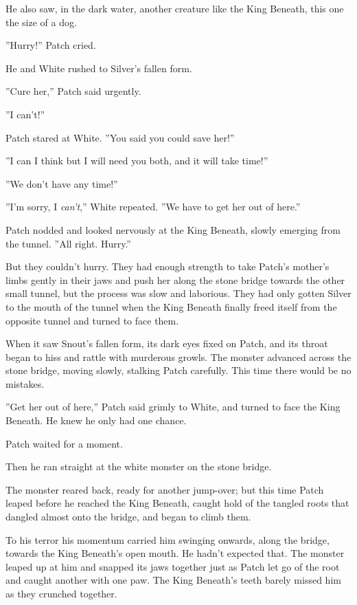 \documentclass[12pt]{book}
\begin{document}
He also saw, in the dark water, another creature like the King Beneath, this one the size of a dog.\par
''Hurry!'' Patch cried.\par
He and White rushed to Silver's fallen form.\par
''Cure her,'' Patch said urgently.\par
''I can't!''\par
Patch stared at White. ''You said you could save her!''\par
''I can %
 I think %
 but I will need you both, and it will take time!''\par
''We don't have any time!''\par
''I'm sorry, I {\it can't},'' White repeated. ''We have to get her out of here.''\par
 Patch nodded and looked nervously at the King Beneath, slowly emerging from the tunnel. ''All right. Hurry.''\par
 But they couldn't hurry. They had enough strength to take Patch's mother's limbs gently in their jaws and push her along the stone bridge towards the other small tunnel, but the process was slow and laborious. They had only gotten Silver to the mouth of the tunnel when the King Beneath finally freed itself from the opposite tunnel and turned to face them.\par
When it saw Snout's fallen form, its dark eyes fixed on Patch, and its throat began to hiss and rattle with murderous growls. The monster advanced across the stone bridge, moving slowly, stalking Patch carefully. This time there would be no mistakes.\par
 ''Get her out of here,'' Patch said grimly to White, and turned to face the King Beneath. He knew he only had one chance.\par
 Patch waited for a moment.\par
Then he ran straight at the white monster on the stone bridge.\par
The monster reared back, ready for another jump-over; but this time Patch leaped before he reached the King Beneath, caught hold of the tangled roots that dangled almost onto the bridge, and began to climb them.\par
To his terror his momentum carried him swinging onwards, along the bridge, towards the King Beneath's open mouth. He hadn't expected that. The monster leaped up at him %
 and snapped its jaws together just as Patch let go of the root and caught another with one paw. The King Beneath's teeth barely missed him as they crunched together.\par
\end{document}
